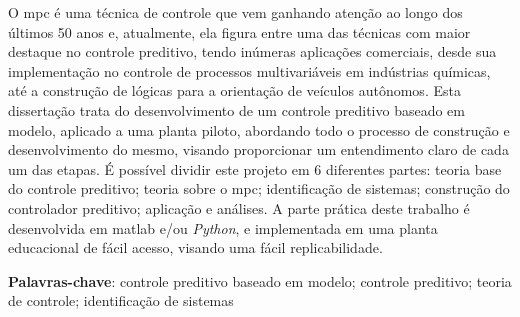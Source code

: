 
\setlength{\absparsep}{18pt} %
\begin{resumo}
    O \acrshort{mpc} é uma técnica de controle que vem ganhando atenção
    ao longo dos últimos 50 anos e, atualmente, ela figura entre uma das técnicas
    com maior destaque no controle preditivo, tendo inúmeras aplicações comerciais,
    desde sua implementação no controle de processos multivariáveis em indústrias químicas,
    até a construção de lógicas para a orientação de veículos autônomos. Esta dissertação
    trata do desenvolvimento de um controle preditivo baseado em modelo,
    aplicado a uma planta piloto, abordando todo o processo de construção e desenvolvimento
    do mesmo, visando proporcionar um entendimento claro de cada um das etapas. É possível
    dividir este projeto em 6 diferentes partes: teoria base do controle
    preditivo; teoria sobre o \acrshort{mpc}; identificação de sistemas; construção do
    controlador preditivo; aplicação e análises. A parte prática deste trabalho é
    desenvolvida em \acrshort{matlab} e/ou \textit{Python}, e implementada em uma
    planta educacional de fácil acesso, visando uma fácil replicabilidade.
    
    \vspace{\onelineskip}

    \noindent 
    \textbf{Palavras-chave}: controle preditivo baseado em modelo; controle preditivo; teoria de controle; identificação de sistemas
\end{resumo}